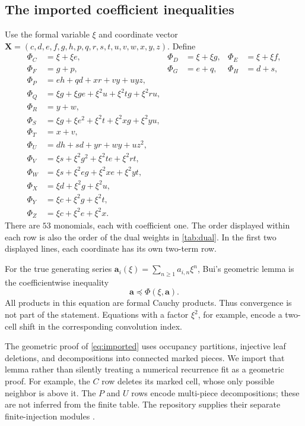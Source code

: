 \documentclass[11pt,a4paper]{article}
\theoremstyle{definition}
\theoremstyle{remark}
\newcommand{\bA}{\boldsymbol a}
\newcommand{\bX}{\boldsymbol X}
\begin{document}
\subsection{The imported coefficient inequalities}
Use the formal variable $\xi$ and coordinate vector
$\bX=(c,d,e,f,g,h,p,q,r,s,t,u,v,w,x,y,z)$. Define
\begin{equation}\label{eq:map}
\begin{aligned}
\Phi_C&=\xi+\xi e,&\Phi_D&=\xi+\xi g,&\Phi_E&=\xi+\xi f,\\
\Phi_F&=g+p,&\Phi_G&=e+q,&\Phi_H&=d+s,\\
\Phi_P&=eh+qd+xr+vy+uyz,\\
\Phi_Q&=\xi g+\xi ge+\xi^2u+\xi^2tg+\xi^2ru,\\
\Phi_R&=y+w,\\
\Phi_S&=\xi g+\xi e^2+\xi^2t+\xi^2xg+\xi^2yu,\\
\Phi_T&=x+v,\\
\Phi_U&=dh+sd+yr+wy+uz^2,\\
\Phi_V&=\xi s+\xi^2g^2+\xi^2te+\xi^2rt,\\
\Phi_W&=\xi s+\xi^2eg+\xi^2xe+\xi^2yt,\\
\Phi_X&=\xi d+\xi^2g+\xi^2u,\\
\Phi_Y&=\xi c+\xi^2g+\xi^2t,\\
\Phi_Z&=\xi c+\xi^2e+\xi^2x.
\end{aligned}
\end{equation}
There are $53$ monomials, each with coefficient one. The order displayed
within each row is also the order of the dual weights in
\cref{tab:dual}. In the first two displayed lines, each coordinate has its
own two-term row.

For the true generating series
$\bA_i(\xi)=\sum_{n\geq1}a_{i,n}\xi^n$, Bui's geometric lemma is the
coefficientwise inequality
\begin{equation}\label{eq:imported}
 \bA\preceq\Phi(\xi,\bA).
\end{equation}
All products in this equation are formal Cauchy products. Thus convergence is
not part of the statement. Equations with a factor $\xi^2$, for example,
encode a two-cell shift in the corresponding convolution index.

The geometric proof of \eqref{eq:imported} uses occupancy partitions,
injective leaf deletions, and decompositions into connected marked pieces.
We import that lemma rather than silently treating a numerical recurrence
fit as a geometric proof. For example, the $C$ row deletes its marked cell,
whose only possible neighbor is above it. The $P$ and $U$ rows encode
multi-piece decompositions; these are not inferred from the finite table.
The repository supplies their separate finite-injection modules
\cite{bui,repocomplete}.
\end{document}
